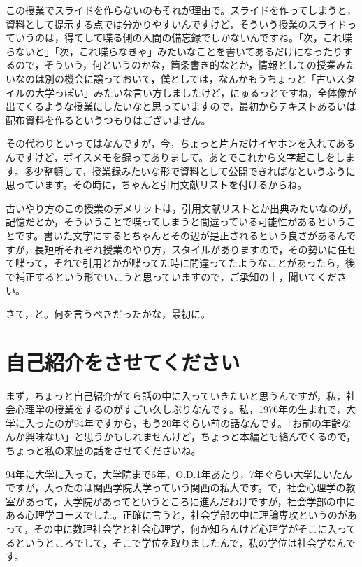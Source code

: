 \documentclass{ltjsbook}
\begin{document}
この授業でスライドを作らないのもそれが理由で。スライドを作ってしまうと，資料として提示する点では分かりやすいんですけど，そういう授業のスライドっていうのは，得てして喋る側の人間の備忘録でしかないんですね。「次，これ喋らないと」「次，これ喋らなきゃ」みたいなことを書いてあるだけになったりするので，そういう，何というのかな，箇条書き的なとか，情報としての授業みたいなのは別の機会に譲っておいて，僕としては，なんかもうちょっと「古いスタイルの大学っぽい」みたいな言い方しましたけど，にゅるっとですね，全体像が出てくるような授業にしたいなと思っていますので，最初からテキストあるいは配布資料を作るというつもりはございません。

その代わりといってはなんですが，今，ちょっと片方だけイヤホンを入れてあるんですけど，ボイスメモを録ってありまして。あとでこれから文字起こしをします。多少整頓して，授業録みたいな形で資料として公開できればなというふうに思っています。その時に，ちゃんと引用文献リストを付けるからね。

古いやり方のこの授業のデメリットは，引用文献リストとか出典みたいなのが，記憶だとか，そういうことで喋ってしまうと間違っている可能性があるということです。書いた文字にするとちゃんとその辺が是正されるという良さがあるんですが，長短所それぞれ授業のやり方，スタイルがありますので，その勢いに任せて喋って，それで引用とかが喋ってた時に間違ってたようなことがあったら，後で補正するという形でいこうと思っていますので，ご承知の上，聞いてください。


さて，と。何を言うべきだったかな，最初に。

\section{自己紹介をさせてください}

まず，ちょっと自己紹介がてら話の中に入っていきたいと思うんですが，私，社会心理学の授業をするのがすごい久しぶりなんです。私，1976年の生まれで，大学に入ったのが94年ですから，もう20年ぐらい前の話なんです。「お前の年齢なんか興味ない」と思うかもしれませんけど，ちょっと本編とも絡んでくるので，ちょっと私の来歴の話をさせてくださいね。

94年に大学に入って，大学院まで6年，O.D.1年あたり，7年ぐらい大学にいたんですが，入ったのは関西学院大学っていう関西の私大です。で，社会心理学の教室があって，大学院があってというところに進んだわけですが，社会学部の中にある心理学コースでした。正確に言うと，社会学部の中に理論専攻というのがあって，その中に数理社会学と社会心理学，何か知らんけど心理学がそこに入ってるというところでして，そこで学位を取りましたんで，私の学位は社会学なんです。
\end{document}
